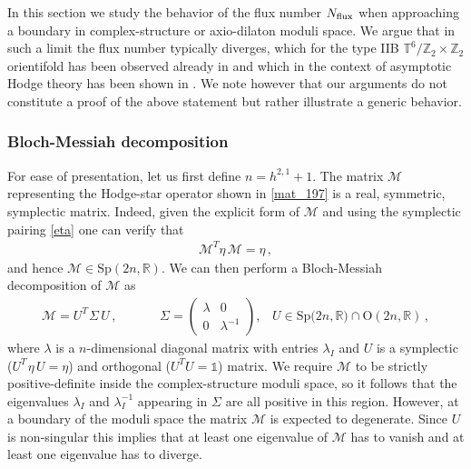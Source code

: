 \documentclass[12pt,a4paper]{article}
\newcommand{\eq}[1]{\begin{equation}
                     \begin{split} #1 \end{split}
                     \end{equation}}
\newcommand{\op}{\hspace{1pt}}
\numberwithin{equation}{section}
\begin{document}
In this section we study the behavior of the flux number $N_{\rm flux}$ 
when approaching a boundary in complex-structure or 
axio-dilaton moduli space. 
We argue that in such a limit the flux number typically diverges,
which for  the type IIB $\mathbb T^6/\mathbb Z_2\times \mathbb Z_2$ orientifold
has been observed already in \cite{Betzler:2019kon}
and which in the context of asymptotic Hodge theory has been shown in 
\cite{Grimm:2020cda}.
We note however that our arguments do not constitute a 
proof of the above statement but rather illustrate a generic behavior. 




\subsubsection*{Bloch-Messiah decomposition}

For ease of presentation, let us first define $n=h^{2,1}+1$. 
The matrix $\mathcal M$ representing the Hodge-star operator 
 shown in \eqref{mat_197}  is a 
real, symmetric, symplectic  matrix. Indeed, given the explicit form 
of $\mathcal M$  and using the symplectic pairing \eqref{eta}
one can verify that
\eq{
 \mathcal M^T \eta \, \mathcal M  = \eta \,,
}
and hence $\mathcal M \in \mathrm{Sp}(2n,\mathbb R)$. 
We can then perform a Bloch-Messiah decomposition of $\mathcal M$ as
\eq{
  \label{decomp_402}
  \mathcal M = U^T \op \Sigma \, U \,,\hspace{40pt}
  \Sigma = \left( \begin{array}{cc} \lambda & 0 \\ 0 & \lambda^{-1} \end{array}\right), 
  \hspace{10pt} 
  U \in \mathrm{Sp}\bigl(2n,\mathbb R\bigr) \cap \mathrm{O}(2n,\mathbb R) \,,
}
where $\lambda$ is a $n$-dimensional diagonal matrix with entries $\lambda_I$ 
and $U$ is a symplectic ($U^T\op\eta \, U = \eta$) 
and orthogonal ($U^T U = \mathds 1$) matrix. 
We require $\mathcal M$ to be strictly positive-definite inside the 
complex-structure moduli space, so it follows that the eigenvalues $\lambda_I$ and $\lambda_I^{-1}$  appearing in 
$\Sigma$ are all positive in this region. 
However, at a boundary of the moduli space the matrix $\mathcal M$ 
is expected to degenerate. Since $U$ is non-singular this implies that at least one eigenvalue of $\mathcal M$ 
has to vanish and at least one eigenvalue has to diverge. 
\end{document}
